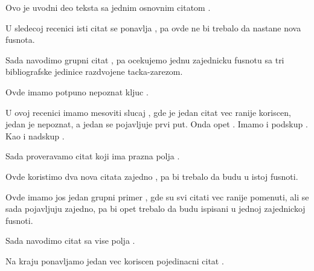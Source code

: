 \documentclass{article}
\begin{document}
Ovo je uvodni deo teksta sa jednim osnovnim citatom \cite{knjigaA}.

U sledecoj recenici isti citat se ponavlja \cite{knjigaA}, pa ovde ne bi trebalo da nastane nova fusnota.

Sada navodimo grupni citat \cite{clanakB,radC,konfD}, pa ocekujemo jednu zajednicku fusnotu sa tri bibliografske jedinice razdvojene tacka-zarezom.

Ovde imamo potpuno nepoznat kljuc \cite{nepoznat1}.

U ovoj recenici imamo mesoviti slucaj \cite{knjigaA,nepoznat2,knjigaE}, gde je jedan citat vec ranije koriscen, jedan je nepoznat, a jedan se pojavljuje prvi put.
Onda opet \cite{knjigaA,nepoznat2,knjigaE}.
Imamo i podskup \cite{knjigaA,nepoznat2}.
Kao i nadskup \cite{knjigaA,nepoznat2,knjigaE,radF}.

Sada proveravamo citat koji ima prazna polja \cite{nepotpunZapis}.

Ovde koristimo dva nova citata zajedno \cite{radF,knjigaG}, pa bi trebalo da budu u istoj fusnoti.

Ovde imamo jos jedan grupni primer \cite{knjigaA,clanakB,radF}, gde su svi citati vec ranije pomenuti, ali se sada pojavljuju zajedno, pa bi opet trebalo da budu ispisani u jednoj zajednickoj fusnoti.

Sada navodimo citat sa vise polja \cite{detaljanRad}.

Na kraju ponavljamo jedan vec koriscen pojedinacni citat \cite{detaljanRad}.



\end{document}
